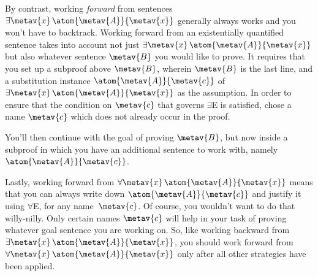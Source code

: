 By contrast, working \emph{forward} from sentences $\exists \metav{x}\, \atom{\metav{A}}{\metav{x}}$ generally always works and you won't have to backtrack. Working forward from an existentially quantified sentence takes into account not just $\exists \metav{x}\, \atom{\metav{A}}{\metav{x}}$ but also whatever sentence $\metav{B}$ you would like to prove. It requires that you set up a subproof above $\metav{B}$, wherein $\metav{B}$ is the last line, and a substitution instance $\atom{\metav{A}}{\metav{c}}$ of $\exists \metav{x}\, \atom{\metav{A}}{\metav{x}}$ as the assumption.  In order to ensure that the condition on $\metav{c}$ that governs $\exists$E is satisfied, chose a name $\metav{c}$ which does not already occur in the proof.
\begin{fitchproof}
	\ellipsesline
	\ellipsesline
	\open
	\AS
	\ellipsesline
	\close
\end{fitchproof}
You'll then continue with the goal of proving $\metav{B}$, but now inside a subproof in which you have an additional sentence to work with, namely~$\atom{\metav{A}}{\metav{c}}$.

Lastly, working forward from $\forall \metav{x}\, \atom{\metav{A}}{\metav{x}}$ means that you can always write down $\atom{\metav{A}}{\metav{c}}$ and justify it using $\forall$E, for any name~$\metav{c}$. Of course, you wouldn't want to do that willy-nilly. Only certain names $\metav{c}$ will help in your task of proving whatever goal sentence you are working on. So, like working backward from $\exists \metav{x}\, \atom{\metav{A}}{\metav{x}}$, you should work forward from $\forall \metav{x}\, \atom{\metav{A}}{\metav{x}}$ only after all other strategies have been applied.

